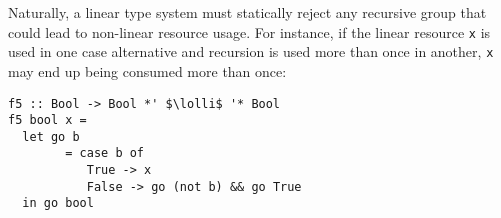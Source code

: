 \documentclass[acmsmall,review,screen]{acmart}
\newcommand{\incode}[1]{\lstinline{#1}}
\newcommand{\lolli}{\multimap}
\begin{document}
Naturally, a linear type system must statically reject any recursive group that could
lead to non-linear resource usage.
%
%
%
For instance, if the linear resource \incode{x} is used in one case alternative and
recursion is used more than once in another, \incode{x} may end up being consumed
more than once:
%
\begin{noway}
\begin{lstlisting}
f5 :: Bool -> Bool *' $\lolli$ '* Bool
f5 bool x =
  let go b
        = case b of
           True -> x
           False -> go (not b) && go True
  in go bool
\end{lstlisting}
\end{noway}
%
\end{document}
